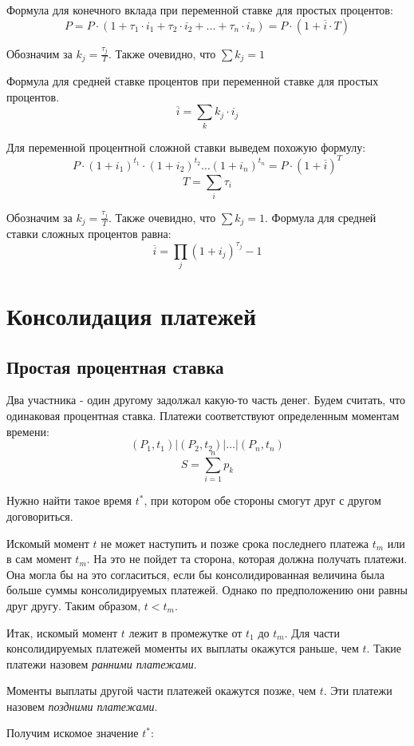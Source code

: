 \documentclass[aps,%
12pt,%
final,%
oneside,
onecolumn,%
musixtex, %
superscriptaddress,%
centertags]{article} %
\begin{document}
Формула для конечного вклада при переменной ставке для простых процентов:
$$ P = P \cdot (1+\tau_1 \cdot i_1 + \tau_2 \cdot i_2 + ... + \tau_n \cdot i_n) = P \cdot (1+ \overline{i}\cdot T) $$

Обозначим за $ k_j = \frac{\tau_j}{T}$. Также очевидно, что $\sum k_j = 1$

Формула для средней ставке процентов при переменной ставке для простых процентов.
$$ \overline{i} = \sum_{k}{k_j\cdot i_j} $$

Для переменной процентной сложной ставки выведем похожую формулу:
$$ P \cdot (1+i_1)^{t_1} \cdot (1+i_2)^{t_2} \ldots (1+i_n)^{t_n} =P \cdot  (1+\overline{i})^{T} $$
$$ T =  \sum_{i}{\tau_i} $$

Обозначим за $ k_j = \frac{\tau_j}{T}$. Также очевидно, что $\sum k_j = 1$.
Формула для средней ставки сложных процентов равна:
$$ \overline{i} = \prod_j (1+i_j)^{\tau_j}  - 1 $$

\section{Консолидация платежей}

\subsection{Простая процентная ставка}
Два участника - один другому задолжал какую-то часть денег. Будем считать, что одинаковая процентная ставка. Платежи соответствуют определенным моментам времени:
$$ (P_1,t_1) | (P_2,t_2) | \ldots | (P_n,t_n)$$
$$S =  \sum_{i=1}^{n} p_k$$

Нужно найти такое время $t^*$, при котором обе стороны смогут друг с другом договориться.

Искомый момент $t$ не может наступить и позже срока последнего платежа $t_m$ или в сам момент $t_m$. На это не пойдет та сторона, которая должна получать платежи. Она могла бы на это согласиться, если бы консолидированная величина была больше суммы консолидируемых платежей. Однако по предположению они равны друг другу. Таким образом, $ t < t_m $.

Итак, искомый момент $t$ лежит в промежутке от $t_1$ до $t_m$. Для части консолидируемых платежей моменты их выплаты окажутся раньше, чем $t$.
Такие платежи назовем \textit{ранними платежами}. 

Моменты выплаты другой части платежей окажутся позже, чем $t$. Эти платежи назовем \textit{поздними платежами}.

Получим искомое значение $t^*$:
\end{document}
